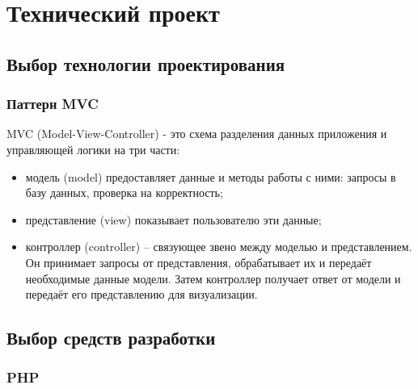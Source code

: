 \section{Технический проект}

\subsection{Выбор технологии проектирования}
\subsubsection{Паттерн MVC}
MVC (Model-View-Controller) - это схема разделения данных приложения и управляющей логики на три части:
\begin{itemize}
	\item модель (model) предоставляет данные и методы работы с ними: запросы в базу данных, проверка на корректность;
	\item представление (view) показывает пользователю эти данные;
	\item контроллер (controller) -- связующее звено между моделью и представлением. Он принимает запросы от представления, обрабатывает их и передаёт необходимые данные модели. Затем контроллер получает ответ от модели и передаёт его представлению для визуализации.
\end{itemize}

\subsection{Выбор средств разработки}
\subsubsection{PHP}

